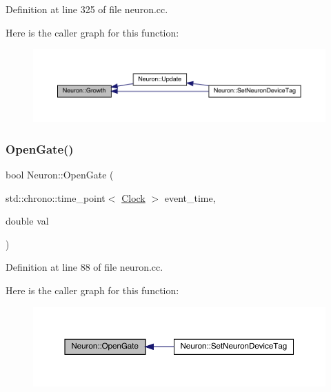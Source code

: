Definition at line 325 of file neuron.\+cc.

Here is the caller graph for this function\+:
\nopagebreak
\begin{figure}[H]
\begin{center}
\leavevmode
\includegraphics[width=350pt]{class_neuron_a82b34717999a29e5413ebfcfa58c9356_icgraph}
\end{center}
\end{figure}
\mbox{\label{class_neuron_a82d0a4739244d79ff929be01eeb0be28}} 
\subsubsection{\texorpdfstring{Open\+Gate()}{OpenGate()}}
{\footnotesize\ttfamily bool Neuron\+::\+Open\+Gate (\begin{DoxyParamCaption}\item[{std\+::chrono\+::time\+\_\+point$<$ \hyperlink{universe_8h_a0ef8d951d1ca5ab3cfaf7ab4c7a6fd80}{Clock} $>$}]{event\+\_\+time,  }\item[{double}]{val }\end{DoxyParamCaption})}



Definition at line 88 of file neuron.\+cc.

Here is the caller graph for this function\+:
\nopagebreak
\begin{figure}[H]
\begin{center}
\leavevmode
\includegraphics[width=350pt]{class_neuron_a82d0a4739244d79ff929be01eeb0be28_icgraph}
\end{center}
\end{figure}
\mbox{\label{class_neuron_a190ae0628482048bef95c8b318939322}} 
